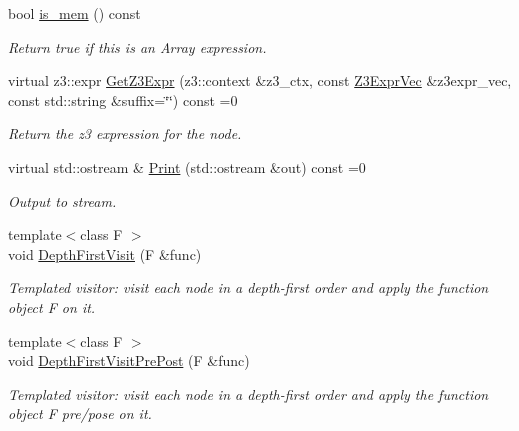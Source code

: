 \begin{DoxyCompactItemize}
\mbox{\label{classilang_1_1_expr_a354b84f94e2c0c847b05fa27764dc679}} 
bool \mbox{\hyperlink{classilang_1_1_expr_a354b84f94e2c0c847b05fa27764dc679}{is\+\_\+mem}} () const
\begin{DoxyCompactList}\small\item\em Return true if this is an Array expression. \end{DoxyCompactList}\item 
\mbox{\label{classilang_1_1_expr_a061fbe78d239f6361f3f6f166db6791d}} 
virtual z3\+::expr \mbox{\hyperlink{classilang_1_1_expr_a061fbe78d239f6361f3f6f166db6791d}{Get\+Z3\+Expr}} (z3\+::context \&z3\+\_\+ctx, const \mbox{\hyperlink{namespaceilang_adc4eee919aa24fff882d03a48d733c19}{Z3\+Expr\+Vec}} \&z3expr\+\_\+vec, const std\+::string \&suffix=\char`\"{}\char`\"{}) const =0
\begin{DoxyCompactList}\small\item\em Return the z3 expression for the node. \end{DoxyCompactList}\item 
\mbox{\label{classilang_1_1_expr_a42b2e7df92a760c27d552a7bf290548f}} 
virtual std\+::ostream \& \mbox{\hyperlink{classilang_1_1_expr_a42b2e7df92a760c27d552a7bf290548f}{Print}} (std\+::ostream \&out) const =0
\begin{DoxyCompactList}\small\item\em Output to stream. \end{DoxyCompactList}\item 
\mbox{\label{classilang_1_1_expr_a5268dad030d0de677c9d75f813f8abc2}} 
{\footnotesize template$<$class F $>$ }\\void \mbox{\hyperlink{classilang_1_1_expr_a5268dad030d0de677c9d75f813f8abc2}{Depth\+First\+Visit}} (F \&func)
\begin{DoxyCompactList}\small\item\em Templated visitor\+: visit each node in a depth-\/first order and apply the function object F on it. \end{DoxyCompactList}\item 
\mbox{\label{classilang_1_1_expr_a59a69876f88ad19374ec0e1815d77b18}} 
{\footnotesize template$<$class F $>$ }\\void \mbox{\hyperlink{classilang_1_1_expr_a59a69876f88ad19374ec0e1815d77b18}{Depth\+First\+Visit\+Pre\+Post}} (F \&func)
\begin{DoxyCompactList}\small\item\em Templated visitor\+: visit each node in a depth-\/first order and apply the function object F pre/pose on it. \end{DoxyCompactList}\end{DoxyCompactItemize}
